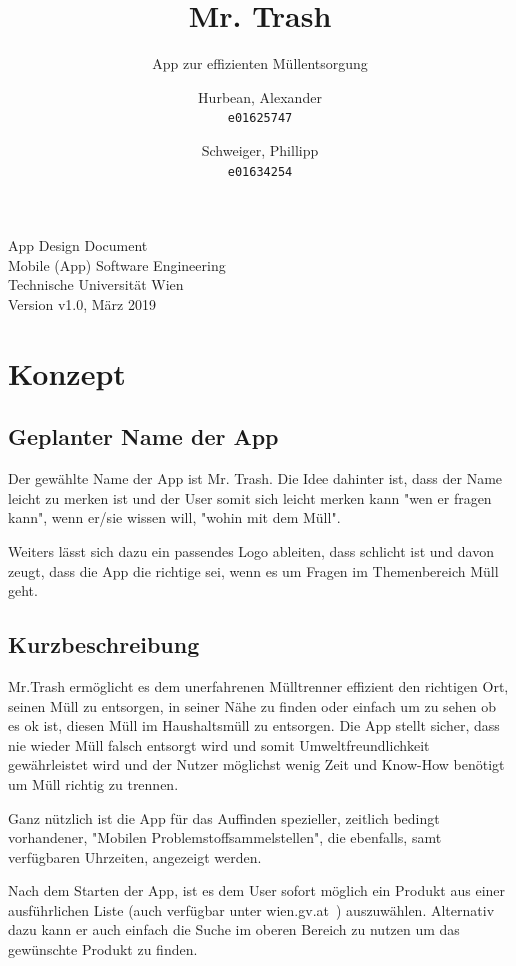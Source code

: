 \documentclass[12pt, a4paper]{scrreprt}
\title{Mr. Trash}
\subtitle{App zur effizienten Müllentsorgung}
\author{
    Hurbean, Alexander\\
    \texttt{e01625747}
    \and
    Schweiger, Phillipp\\
    \texttt{e01634254}}
\begin{document}
\maketitle

\null\vfill
\noindent
App Design Document\\ 
Mobile (App) Software Engineering\\
Technische Universität Wien\\
Version v1.0, März 2019
\newpage

\tableofcontents

\chapter{Konzept}

\section{Geplanter Name der App}
Der gewählte Name der App ist Mr. Trash. Die Idee dahinter ist, dass der Name leicht zu merken ist und der User somit sich leicht merken kann "wen er fragen kann", wenn er/sie wissen will, "wohin mit dem Müll".

Weiters lässt sich dazu ein passendes Logo ableiten, dass schlicht ist und davon zeugt, dass die App die richtige sei, wenn es um Fragen im Themenbereich Müll geht.

\section{Kurzbeschreibung}
Mr.Trash ermöglicht es dem unerfahrenen Mülltrenner effizient den richtigen Ort, seinen Müll zu entsorgen, in seiner Nähe zu finden oder einfach um zu sehen ob es ok ist, diesen Müll im Haushaltsmüll zu entsorgen. Die App stellt sicher, dass nie wieder Müll falsch entsorgt wird und somit Umweltfreundlichkeit gewährleistet wird und der Nutzer möglichst wenig Zeit und Know-How benötigt um Müll richtig zu trennen.

Ganz nützlich ist die App für das Auffinden spezieller, zeitlich bedingt vorhandener, "Mobilen Problemstoffsammelstellen", die ebenfalls, samt verfügbaren Uhrzeiten, angezeigt werden.

Nach dem Starten der App, ist es dem User sofort möglich ein Produkt aus einer ausführlichen Liste (auch verfügbar unter wien.gv.at~\cite{muelltrennabc}) auszuwählen. Alternativ dazu kann er auch einfach die Suche im oberen Bereich zu nutzen um das gewünschte Produkt zu finden.
\end{document}

